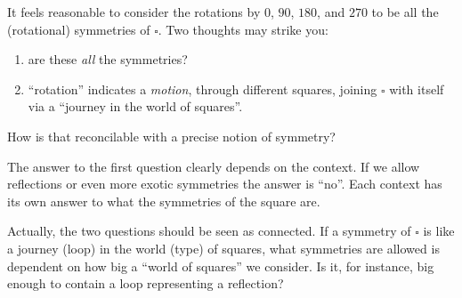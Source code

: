 It feels reasonable to consider the rotations by $0$\textdegree, $90$\textdegree, $180$\textdegree, and $270$\textdegree{} to be all the (rotational) symmetries of $\square$.  Two thoughts may strike you:
\begin{enumerate}
\item
  are these \emph{all} the symmetries?
\item ``rotation'' indicates a \emph{motion}, through different squares, joining $\square$ with itself via a ``journey in the world of squares''.
\end{enumerate}
\begin{center}
\end{center}
How is that reconcilable with a precise notion of symmetry?

The answer to the first question clearly depends on the context.  If we allow reflections or even more exotic symmetries the answer is ``no''.  Each context has its own answer to what the symmetries of the square are.

Actually, the two questions should be seen as connected.  If a symmetry of $\square$ is like a journey (loop) in the world (type) of squares, what symmetries are allowed is dependent on how big a ``world of squares'' we consider.  Is it, for instance, big enough to contain a loop representing a reflection?

